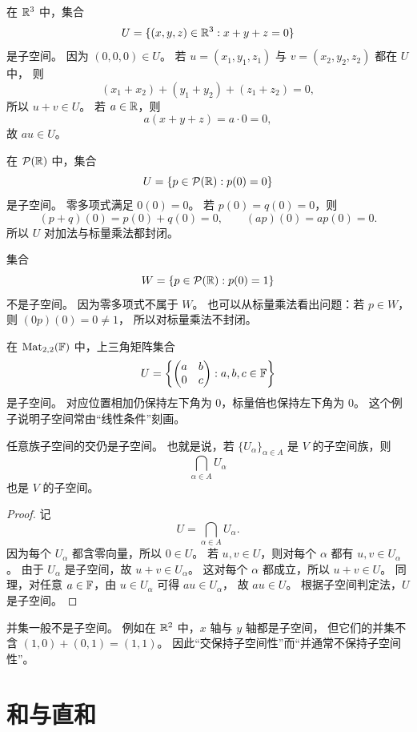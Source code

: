 \begin{example} 在 $\mathbb{R}^3$ 中，集合
\[ U=\{(x,y,z)\in\mathbb{R}^3:x+y+z=0\}
\] 是子空间。
因为 $(0,0,0)\in U$。 若 $u=(x_1,y_1,z_1)$ 与 $v=(x_2,y_2,z_2)$ 都在 $U$ 中，
则 \[
(x_1+x_2)+(y_1+y_2)+(z_1+z_2)=0, \]
所以 $u+v\in U$。 若 $a\in\mathbb{R}$，则
\[ a(x+y+z)=a\cdot 0=0,
\] 故 $au\in U$。
\end{example}

\begin{example} 在 $\mathcal{P}(\mathbb{R})$ 中，集合
\[ U=\{p\in\mathcal{P}(\mathbb{R}):p(0)=0\}
\] 是子空间。
零多项式满足 $0(0)=0$。 若 $p(0)=q(0)=0$，则
\[ (p+q)(0)=p(0)+q(0)=0,
\qquad (ap)(0)=a p(0)=0.
\] 所以 $U$ 对加法与标量乘法都封闭。
\end{example}

\begin{example} 集合
\[ W=\{p\in\mathcal{P}(\mathbb{R}):p(0)=1\}
\] 不是子空间。
因为零多项式不属于 $W$。 也可以从标量乘法看出问题：若 $p\in W$，则 $(0p)(0)=0\neq 1$，
所以对标量乘法不封闭。 \end{example}

\begin{example} 在 $\mathrm{Mat}_{2,2}(\mathbb{F})$ 中，上三角矩阵集合
\[ U=\left\{\begin{pmatrix} a&b\\0&c \end{pmatrix}:a,b,c\in\mathbb{F}\right\}
\] 是子空间。
对应位置相加仍保持左下角为 $0$，标量倍也保持左下角为 $0$。 这个例子说明子空间常由“线性条件”刻画。
\end{example}

\begin{theorem} 任意族子空间的交仍是子空间。
也就是说，若 $\{U_\alpha\}_{\alpha\in A}$ 是 $V$ 的子空间族，则 \[
\bigcap_{\alpha\in A} U_\alpha \]
也是 $V$ 的子空间。 \end{theorem}

\begin{proof} 记
\[ U=\bigcap_{\alpha\in A} U_\alpha.
\] 因为每个 $U_\alpha$ 都含零向量，所以 $0\in U$。
若 $u,v\in U$，则对每个 $\alpha$ 都有 $u,v\in U_\alpha$。 由于 $U_\alpha$ 是子空间，故 $u+v\in U_\alpha$。
这对每个 $\alpha$ 都成立，所以 $u+v\in U$。 同理，对任意 $a\in\mathbb{F}$，由 $u\in U_\alpha$ 可得 $au\in U_\alpha$，
故 $au\in U$。 根据子空间判定法，$U$ 是子空间。
\end{proof}

\begin{remark} 并集一般不是子空间。
例如在 $\mathbb{R}^2$ 中，$x$ 轴与 $y$ 轴都是子空间， 但它们的并集不含 $(1,0)+(0,1)=(1,1)$。
因此“交保持子空间性”而“并通常不保持子空间性”。 \end{remark}

\section{和与直和}

